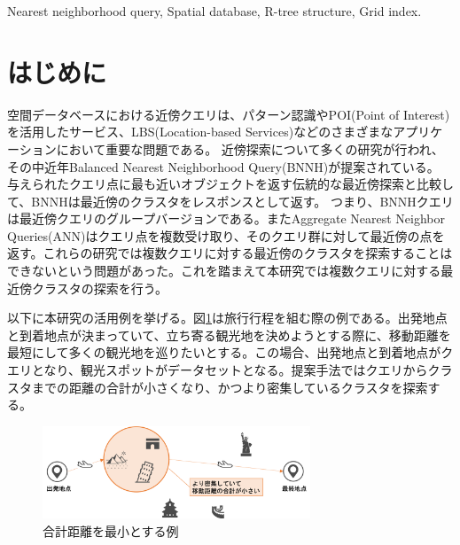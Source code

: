 \documentclass{deimj}
\theoremstyle{definition}
\begin{document}
\pagestyle{empty}
\begin{jkeyword}
Nearest neighborhood query, Spatial database, R-tree structure, Grid index.
\end{jkeyword}
\maketitle

\section{はじめに}

空間データベースにおける近傍クエリは、パターン認識やPOI(Point of Interest)を活用したサービス、LBS(Location-based Services)などのさまざまなアプリケーションにおいて重要な問題である。 近傍探索について多くの研究が行われ、その中近年Balanced Nearest Neighborhood Query(BNNH)\cite{NNH}が提案されている。 与えられたクエリ点に最も近いオブジェクトを返す伝統的な最近傍探索と比較して、BNNHは最近傍のクラスタをレスポンスとして返す。 つまり、BNNHクエリは最近傍クエリのグループバージョンである。またAggregate Nearest Neighbor Queries(ANN)\cite{ANN}はクエリ点を複数受け取り、そのクエリ群に対して最近傍の点を返す。これらの研究では複数クエリに対する最近傍のクラスタを探索することはできないという問題があった。これを踏まえて本研究では複数クエリに対する最近傍クラスタの探索を行う。

以下に本研究の活用例を挙げる。図\ref{fig:ex-sum}は旅行行程を組む際の例である。出発地点と到着地点が決まっていて、立ち寄る観光地を決めようとする際に、移動距離を最短にして多くの観光地を巡りたいとする。この場合、出発地点と到着地点がクエリとなり、観光スポットがデータセットとなる。提案手法ではクエリからクラスタまでの距離の合計が小さくなり、かつより密集しているクラスタを探索する。

\begin{figure}[H]
	\centering
    \includegraphics[width=8cm]{images/ex-sum.png}
    \caption{合計距離を最小とする例}
    \label{fig:ex-sum}
\end{figure}
\end{document}
